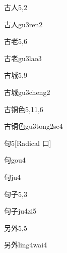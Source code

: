 \begin{entry}{古人}{5,2}
  \begin{phonetics}{古人}{gu3ren2}
  \end{phonetics}
\end{entry}

\begin{entry}{古老}{5,6}
  \begin{phonetics}{古老}{gu3lao3}
  \end{phonetics}
\end{entry}

\begin{entry}{古城}{5,9}
  \begin{phonetics}{古城}{gu3cheng2}
  \end{phonetics}
\end{entry}

\begin{entry}{古铜色}{5,11,6}
  \begin{phonetics}{古铜色}{gu3tong2se4}
  \end{phonetics}
\end{entry}

\begin{entry}{句}{5}[Radical 口]
  \begin{phonetics}{句}{gou4}
  \end{phonetics}
  \begin{phonetics}{句}{ju4}
  \end{phonetics}
\end{entry}

\begin{entry}{句子}{5,3}
  \begin{phonetics}{句子}{ju4zi5}
  \end{phonetics}
\end{entry}

\begin{entry}{另外}{5,5}
  \begin{phonetics}{另外}{ling4wai4}
  \end{phonetics}
\end{entry}

